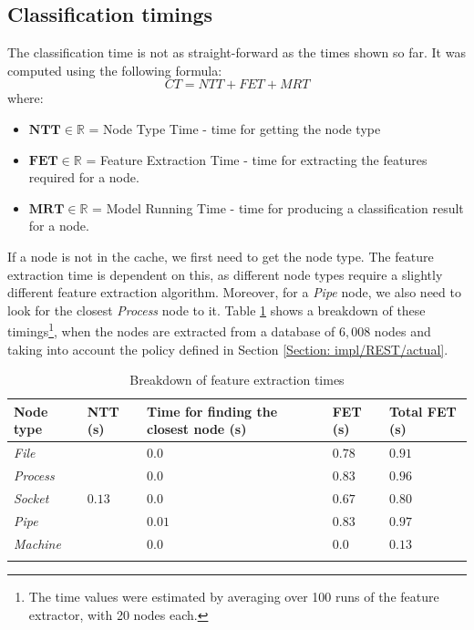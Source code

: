 		\subsection{Classification timings} \label{Section: eval/service-time/classification}
			The classification time is not as straight-forward as the times shown so far. It was computed using the following formula:
			\begin{equation}
				CT = NTT + FET + MRT
			\end{equation}
			where: 
			\begin{itemize}
				\item $\mathbf{NTT} \in \mathbb{R}$ = Node Type Time - time for getting the node type
				\item $\mathbf{FET} \in \mathbb{R}$ = Feature Extraction Time - time for extracting the features required for a node.
				\item $\mathbf{MRT} \in \mathbb{R}$ = Model Running Time - time for producing a classification result for a node.
			\end{itemize}
			If a node is not in the cache, we first need to get the node type. The feature extraction time is dependent on this, as different node types require a slightly different feature extraction algorithm. Moreover, for a \textit{Pipe} node, we also need to look for the closest \textit{Process} node to it. Table \ref{Table: eval/service-time/classification/fet} shows a breakdown of these timings\footnote{The time values were estimated by averaging over 100 runs of the feature extractor, with 20 nodes each.}, when the nodes are extracted from a database of $6,008$ nodes and taking into account the policy defined in Section \ref{Section: impl/REST/actual}.
			\begin{longtable}{|p{} || p{} | p{}| p{}| p{} | }
				\textbf{Node type} & \textbf{NTT} (s) & \textbf{Time for finding the closest node} (s)& \textbf{FET} (s)& \textbf{Total FET} (s)\\
				\hline
				\textit{File} & \multirow{5}{*}{$0.13$}& $0.0$ & $0.78$& $\mathbf{0.91}$ \\
				\hhline{-~---}
				\textit{Process} & & $0.0$ & $0.83$ & $\mathbf{0.96}$\\
				\hhline{-~---}
				\textit{Socket} & & $0.0$ & $0.67$ & $\mathbf{0.80}$ \\
				\hhline{-~---}
				\textit{Pipe} & & $0.01$ & $0.83$ & $\mathbf{0.97}$ \\
				\hhline{-~---}
				\textit{Machine} & & $0.0$ & $0.0$ & $\mathbf{0.13}$\\
				\hline
				\caption{Breakdown of feature extraction times}
				\label{Table: eval/service-time/classification/fet}
			\end{longtable}		
